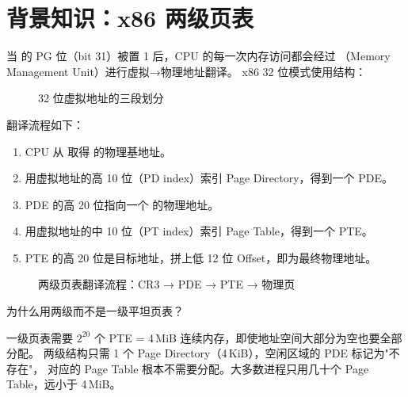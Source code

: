 \section{背景知识：x86 两级页表}

当  的 PG 位（bit 31）被置 1 后，CPU 的每一次内存访问都会经过
（Memory Management Unit）进行虚拟→物理地址翻译。
x86 32 位模式使用结构：

\begin{figure}[H]
  \centering
  
  \caption{32 位虚拟地址的三段划分}
  \label{fig:vaddr-split}
\end{figure}

翻译流程如下：

\begin{enumerate}
  \item CPU 从  取得  的物理基地址。
  \item 用虚拟地址的高 10 位（PD index）索引 Page Directory，得到一个 PDE。
  \item PDE 的高 20 位指向一个  的物理地址。
  \item 用虚拟地址的中 10 位（PT index）索引 Page Table，得到一个 PTE。
  \item PTE 的高 20 位是目标地址，拼上低 12 位 Offset，即为最终物理地址。
\end{enumerate}

\begin{figure}[H]
  \centering
  
  \caption{两级页表翻译流程：CR3 → PDE → PTE → 物理页}
  \label{fig:two-level-walk}
\end{figure}

\begin{whybox}
为什么用两级而不是一级平坦页表？

一级页表需要 $2^{20}$ 个 PTE = 4\,MiB 连续内存，即使地址空间大部分为空也要全部分配。
两级结构只需 1 个 Page Directory（4\,KiB），空闲区域的 PDE 标记为"不存在"，
对应的 Page Table 根本不需要分配。大多数进程只用几十个 Page Table，远小于 4\,MiB。
\end{whybox}


